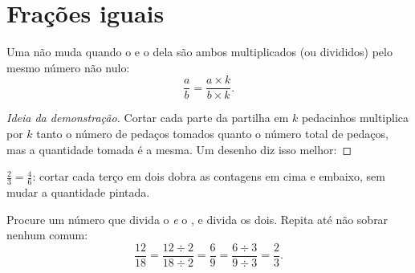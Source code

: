 \section{Frações iguais}

\begin{proposition}\label{prop:g6:fractions:equal}
Uma  não muda quando o  e o  dela são ambos
multiplicados (ou divididos) pelo mesmo número não nulo:
\[
\frac{a}{b} = \frac{a \times k}{b \times k} .
\]
\end{proposition}

\begin{proof}[Ideia da demonstração]
Cortar cada parte da partilha em $k$ pedacinhos multiplica por $k$ tanto
o número de pedaços tomados quanto o número total de pedaços, mas a
quantidade tomada é a mesma. Um desenho diz isso melhor:
\end{proof}

\begin{omfigure}

{\small $\frac23 = \frac46$: cortar cada terço em dois dobra as
contagens em cima e embaixo, sem mudar a quantidade pintada.}
\end{omfigure}

\begin{method}\label{met:g6:fractions:simplify}
Procure um número que divida o  \emph{e} o , e
divida os dois. Repita até não sobrar nenhum  comum:
\[
\frac{12}{18} = \frac{12 \div 2}{18 \div 2} = \frac{6}{9}
= \frac{6 \div 3}{9 \div 3} = \frac{2}{3}.
\]
\end{method}

